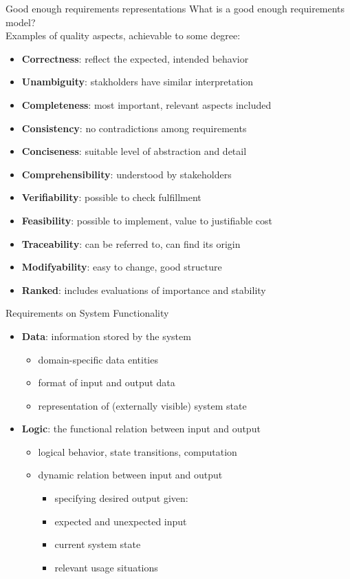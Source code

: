 \documentclass{beamer}
\begin{document}
\begin{frame}[fragile]{Good enough requirements representations}
What is a good enough requirements model?
\\ \vspace*{0.5em}Examples of quality aspects, achievable to some degree:
\begin{itemize}
\item \textbf{Correctness}: reflect the expected, intended behavior
\item \textbf{Unambiguity}: stakholders have similar interpretation
\item \textbf{Completeness}: most important, relevant aspects included
\item \textbf{Consistency}: no contradictions among requirements
\item \textbf{Conciseness}: suitable level of abstraction and detail 
\item \textbf{Comprehensibility}: understood by stakeholders 
\item \textbf{Verifiability}: possible to check fulfillment 
\item \textbf{Feasibility}: possible to implement, value to justifiable cost 
\item \textbf{Traceability}: can be referred to, can find its origin
\item \textbf{Modifyability}: easy to change, good structure
\item \textbf{Ranked}: includes evaluations of importance and stability
\end{itemize}
\end{frame}

\begin{frame}[fragile]{Requirements on System Functionality}
\begin{itemize}
\item \textbf{Data}: information stored by the system 
\begin{itemize}
\item domain-specific data entities
\item format of input and output data
\item representation of (externally visible) system state
\end{itemize}

\item \textbf{Logic}: the functional relation between input and output 
\begin{itemize}
\item logical behavior, state transitions, computation
\item dynamic relation between input and output
\begin{itemize}
  \item specifying desired output given:
  \item expected and unexpected input
  \item current system state
  \item relevant usage situations
\end{itemize}
\end{itemize}

\end{itemize}
\end{frame}
\end{document}
